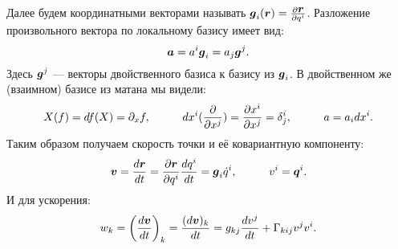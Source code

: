 Далее будем координатными векторами называть $\mbox{\boldmath $g$}_i(\mbox{\boldmath $r$}) = \frac{\partial \mbox{\boldmath $r$}}{\partial q^i}$. Разложение произвольного вектора по локальному базису имеет вид:
\begin{equation*}
	\mbox{\boldmath $a$} = a^i \mbox{\boldmath $g$}_i = a_j \mbox{\boldmath $g$}^j.
\end{equation*}
Здесь $\mbox{\boldmath $g$}^j$ --- векторы двойственного базиса к базису из $\mbox{\boldmath $g$}_i$. В двойственном же (взаимном) базисе из матана мы видели:
\begin{equation*}
	X(f) = d f (X) = \partial_x f,
	\hspace*{1 cm}
	d x^i (\frac{\partial}{\partial x^j}) = \frac{\partial x^i}{\partial x^j} = \delta_j^i,
	\hspace*{1 cm}
	a = a_i d x^i.
\end{equation*}
Таким образом получаем скорость точки и её ковариантную компоненту:
\begin{equation*}
	\mbox{\boldmath $v$} = \frac{d \mbox{\boldmath $r$}}{d t} = \frac{\partial \mbox{\boldmath $r$}}{\partial q^i} \frac{d q^i}{d t} = \mbox{\boldmath $g$}_i \dot{q}^i,
	\hspace*{1 cm}
	v^i = \mbox{\boldmath $q$}^i.
\end{equation*}
И для ускорения:
\begin{equation*}
	w_k = \left(\frac{d \mbox{\boldmath $v$}}{d t}\right)_k = \frac{(d \mbox{\boldmath $v$})_k}{d t} = g_{k j} \frac{d v^j}{d t} + \Gamma_{k i j} v^j v^i.
\end{equation*}
